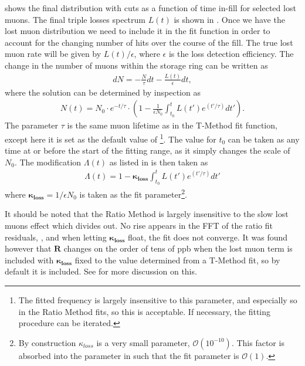  shows the final \DT distribution with cuts as a function of time in-fill for selected lost muons. The final triple losses spectrum $L(t)$ is shown in . Once we have the lost muon distribution we need to include it in the fit function in order to account for the changing number of hits over the course of the fill. The true lost muon rate will be given by $L(t)/\epsilon$, where $\epsilon$ is the loss detection efficiency. The change in the number of muons within the storage ring can be written as 
    \begin{align} 
        dN = -\frac{N}{\tau} dt - \frac{L(t)}{\epsilon} dt, 
    \end{align}
where the solution can be determined by inspection as
    \begin{align} 
        N(t) = N_{0} \cdot e^{-t/\tau} \cdot (1 - \frac{1}{\epsilon N_{0}} \int_{t_{0}}^{t} L(t')e^{(t'/\tau)} dt').
    \end{align}
The parameter $\tau$ is the same muon lifetime as in the T-Method fit function, except here it is set as the default value of \footnote{The fitted \wa frequency is largely insensitive to this parameter, and especially so in the Ratio Method fits, so this is acceptable. If necessary, the fitting procedure can be iterated.}. The value for $t_{0}$ can be taken as any time at or before the start of the fitting range, as it simply changes the scale of $N_{0}$. The modification $\Lambda(t)$ as listed in  is then taken as
    \begin{align} \label{eq:lambdalosses}
        \Lambda(t) = 1 - \boldsymbol{\kappa_{loss}} \int_{t_{0}}^{t} L(t')e^{(t'/\tau)} dt'
    \end{align}
where $\boldsymbol{\kappa_{loss}} = 1/\epsilon N_{0}$ is taken as the fit parameter\footnote{By construction $\kappa_{loss}$ is a very small parameter, $\mathcal{O}(10^{-10})$. This factor is absorbed into the parameter in such that the fit parameter is $\mathcal{O}(1)$.}.

It should be noted that the Ratio Method is largely insensitive to the slow lost muons effect which divides out. No rise appears in the FFT of the ratio fit residuals, , and when letting $\boldsymbol{\kappa_{loss}}$ float, the fit does not converge. It was found however that $\boldsymbol{R}$ changes on the order of tens of ppb when the lost muon term is included with $\boldsymbol{\kappa_{loss}}$ fixed to the value determined from a T-Method fit, so by default it is included. See  for more discussion on this.


